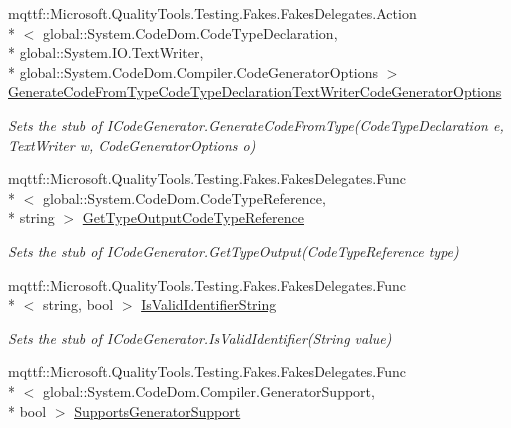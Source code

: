 \begin{DoxyCompactItemize}
mqttf\-::\-Microsoft.\-Quality\-Tools.\-Testing.\-Fakes.\-Fakes\-Delegates.\-Action\\*
$<$ global\-::\-System.\-Code\-Dom.\-Code\-Type\-Declaration, \\*
global\-::\-System.\-I\-O.\-Text\-Writer, \\*
global\-::\-System.\-Code\-Dom.\-Compiler.\-Code\-Generator\-Options $>$ \hyperlink{class_system_1_1_code_dom_1_1_compiler_1_1_fakes_1_1_stub_i_code_generator_a2321da544662fce1770a94c2c2b10f2a}{Generate\-Code\-From\-Type\-Code\-Type\-Declaration\-Text\-Writer\-Code\-Generator\-Options}
\begin{DoxyCompactList}\small\item\em Sets the stub of I\-Code\-Generator.\-Generate\-Code\-From\-Type(\-Code\-Type\-Declaration e, Text\-Writer w, Code\-Generator\-Options o)\end{DoxyCompactList}\item 
mqttf\-::\-Microsoft.\-Quality\-Tools.\-Testing.\-Fakes.\-Fakes\-Delegates.\-Func\\*
$<$ global\-::\-System.\-Code\-Dom.\-Code\-Type\-Reference, \\*
string $>$ \hyperlink{class_system_1_1_code_dom_1_1_compiler_1_1_fakes_1_1_stub_i_code_generator_abb2de69913378e5f8ab1d4a7da69626a}{Get\-Type\-Output\-Code\-Type\-Reference}
\begin{DoxyCompactList}\small\item\em Sets the stub of I\-Code\-Generator.\-Get\-Type\-Output(\-Code\-Type\-Reference type)\end{DoxyCompactList}\item 
mqttf\-::\-Microsoft.\-Quality\-Tools.\-Testing.\-Fakes.\-Fakes\-Delegates.\-Func\\*
$<$ string, bool $>$ \hyperlink{class_system_1_1_code_dom_1_1_compiler_1_1_fakes_1_1_stub_i_code_generator_a7dce71813359065492729ebb34f9efba}{Is\-Valid\-Identifier\-String}
\begin{DoxyCompactList}\small\item\em Sets the stub of I\-Code\-Generator.\-Is\-Valid\-Identifier(\-String value)\end{DoxyCompactList}\item 
mqttf\-::\-Microsoft.\-Quality\-Tools.\-Testing.\-Fakes.\-Fakes\-Delegates.\-Func\\*
$<$ global\-::\-System.\-Code\-Dom.\-Compiler.\-Generator\-Support, \\*
bool $>$ \hyperlink{class_system_1_1_code_dom_1_1_compiler_1_1_fakes_1_1_stub_i_code_generator_a5c35c6c4abf3de2292c409f62033e19d}{Supports\-Generator\-Support}

\end{DoxyCompactItemize}
